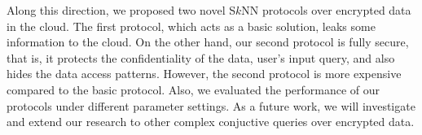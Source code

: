 \documentclass{article}
\begin{document}
Along this direction, we proposed 
two novel S$k$NN protocols over encrypted 
data in the cloud. The first protocol, which acts as a basic solution, leaks some information to 
the cloud. On the other hand, our second protocol is fully secure, that is, it protects the confidentiality of the data, user's 
input query, and also hides 
the data access patterns. However, the second protocol is more expensive compared to the basic protocol. 
Also, we evaluated the performance of our protocols under different parameter settings. As a future work, 
we will investigate and extend our research to other complex conjuctive queries over 
encrypted data. 



 
\end{document}
